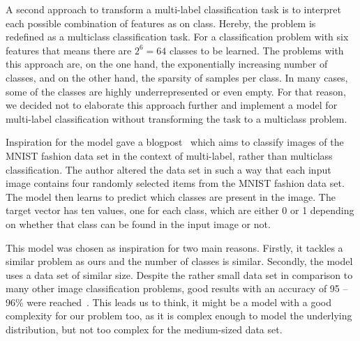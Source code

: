 A second approach to transform a multi-label classification task is to interpret each possible combination of features as on class. Hereby, the problem is redefined as a multiclass classification task. For a classification problem with six features that means there are \(2^{6} = 64\) classes to be learned. The problems with this approach are, on the one hand, the exponentially increasing number of classes, and on the other hand, the sparsity of samples per class. In many cases, some of the classes are highly underrepresented or even empty. For that reason, we decided not to elaborate this approach further and implement a model for multi-label classification without transforming the task to a multiclass problem.

\bigskip
Inspiration for the model gave a blogpost~\citep{blogpostMulti} which aims to classify images of the MNIST fashion data set in the context of multi-label, rather than multiclass classification. The author altered the data set in such a way that each input image contains four randomly selected items from the MNIST fashion data set. The model then learns to predict which classes are present in the image. The target vector has ten values, one for each class, which are either 0 or 1 depending on whether that class can be found in the input image or not.

This model was chosen as inspiration for two main reasons. Firstly, it tackles a similar problem as ours and the number of classes is similar. Secondly, the model uses a data set of similar size. Despite the rather small data set in comparison to many other image classification problems, good results with an accuracy of 95 -- 96\% were reached~\citep{blogpostMulti}. This leads us to think, it might be a model with a good complexity for our problem too, as it is complex enough to model the underlying distribution, but not too complex for the medium-sized data set.

